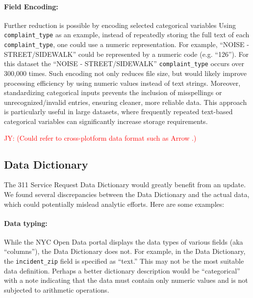 \documentclass[linenumber]{jdsart}
\newcommand{\jy}[1]{\textcolor{red}{JY: (#1)}}
\begin{document}
\paragraph{Field Encoding:} Further reduction is possible 
by encoding selected categorical variables 
Using \texttt{complaint\_type} as an example,
instead of repeatedly storing the full text of each \texttt{complaint\_type}, 
one could use a numeric representation. For example, 
``NOISE - STREET/SIDEWALK'' could be represented by a 
numeric code (e.g. ``126''). For this dataset the 
``NOISE - STREET/SIDEWALK'' \texttt{complaint\_type} occurs 
over 300,000 times. Such encoding not only reduces file 
size, but would likely improve processing efficiency by using numeric
values instead of text strings. Moreover, standardizing 
categorical inputs prevents the inclusion of misspellings 
or unrecognized/invalid entries, ensuring cleaner, more reliable 
data. This approach is particularly useful in large datasets, where 
frequently repeated text-based categorical variables can 
significantly increase storage requirements.

\jy{Could refer to cross-plotform data format such as Arrow
  \citep{bates2024csv}.}


\subsection{Data Dictionary} 
\label{sec:datadictionary}

The 311 Service Request Data Dictionary would greatly benefit from an update. We found several discrepancies between the Data Dictionary and the actual data, which could potentially mislead analytic efforts. Here are some examples:

\paragraph{Data typing:} While the NYC Open Data portal displays the data types of 
various fields (aka ``columns''), the Data Dictionary does 
not. For example, in the Data Dictionary, 
the \texttt{incident\_zip} field is specified as ``text.'' This may 
not be the most suitable data definition. Perhaps a better 
dictionary description would be  ``categorical'' with a note 
indicating that the data must contain only numeric values 
and is not subjected to arithmetic operations.
\end{document}
